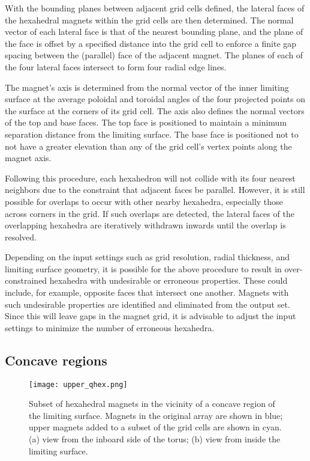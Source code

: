 \documentclass[11pt,onecolumn]{article}
\begin{document}
With the bounding planes between adjacent grid cells defined, the lateral 
faces of the hexahedral magnets within the grid cells are then determined. The 
normal vector of each lateral face is that of the nearest bounding plane,
and the plane of the face is offset by a specified distance into the 
grid cell to enforce a finite gap spacing between the (parallel) face of the
adjacent magnet. The planes of each of the four lateral faces intersect
to form four radial edge lines. 

The magnet's axis is determined from 
the normal vector of the inner limiting surface at the average poloidal and
toroidal angles of the four projected points on the surface at the corners
of its grid cell.
The axis also defines the normal vectors of the top and base faces. The
top face is positioned to maintain a minimum separation distance from the
limiting surface. The base face is positioned not to not have a greater
elevation than any of the grid cell's vertex points along the magnet axis.

Following this procedure, each hexahedron will not collide with its four 
nearest neighbors due to the constraint that adjacent faces be parallel. 
However, it is still possible for overlaps to occur with other nearby hexahedra,
especially those across corners in the grid. If such overlaps are detected,
the lateral faces of the overlapping hexahedra are iteratively withdrawn
inwards until the overlap is resolved.

Depending on the input settings such as grid resolution, radial thickness,
and limiting surface geometry, it is possible for the above procedure to
result in over-constrained hexahedra with undesirable or erroneous properties. 
These could include, for example, opposite faces that intersect one another.
Magnets with such undesirable properties are identified and eliminated from
the output set. Since this will leave gaps in the magnet grid, it is 
advisable to adjust the input settings to minimize the number of erroneous
hexahedra. 

\subsection{Concave regions}
\label{ssect:concave_regions}

\begin{figure}
    \begin{center}
    \texttt{[image: upper\_qhex.png]}
    \caption{Subset of hexahedral magnets in the vicinity of a concave region
             of the limiting surface. Magnets in the original array are 
             shown in blue; upper magnets added to a subset of the grid cells
             are shown in cyan. (a) view from the inboard side of the torus;
             (b) view from inside the limiting surface.}
    \label{fig:upper_qhex}
    \end{center}
\end{figure}
\end{document}

